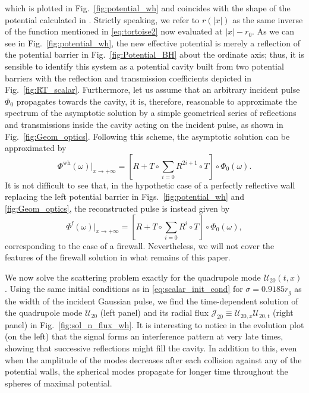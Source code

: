 \documentclass[article,aps,nofootinbib,twocolumn,superscriptaddress]{revtex4-1}
\begin{document}
which is plotted in Fig.~\ref{fig:potential_wh} and coincides with the shape of the potential calculated in \citep{Cardoso:2016oxy}. Strictly speaking, we refer to $r\left(|x|\right)$ as the same inverse of the function mentioned in \eqref{eq:tortoise2} now evaluated at $|x|-r_0$. As we can see in Fig.~\ref{fig:potential_wh}, the new effective potential is merely a reflection of the potential barrier in Fig.~\ref{fig:Potential_BH} about the ordinate axis; thus, it is sensible to identify this system as a potential cavity built from two potential barriers with the reflection and transmission coefficients depicted in Fig.~\ref{fig:RT_scalar}. Furthermore, let us assume that an arbitrary incident pulse $\Phi_0$ propagates towards the cavity, it is, therefore, reasonable to approximate the spectrum of the asymptotic solution by a simple geometrical series of reflections and transmissions inside the cavity acting on the incident pulse, as shown in Fig.~\ref{fig:Geom_optics}. Following this scheme, the asymptotic solution can be approximated by
\begin{equation}
\Phi^{\mathrm{wh}}(\omega)|_{x\rightarrow+\infty}=\left[R+T\circ\sum_{i=0}R^{2i+1}\circ T\right]\circ\Phi_0(\omega).
\label{eq:reconst}
\end{equation}
It is not difficult to see that, in the hypothetic case of a perfectly reflective wall replacing the left potential barrier in Figs.~\ref{fig:potential_wh} and \ref{fig:Geom_optics}, the reconstructed pulse is instead given by 
\begin{equation}
\Phi^{\mathrm{f}}(\omega)|_{x\rightarrow+\infty}=\left[R+T\circ\sum_{i=0}R^i\circ T\right]\circ\Phi_0(\omega),
\label{eq:reconst_firewall}
\end{equation}
corresponding to the case of a firewall. Nevertheless, we will not cover the features of the firewall solution in what remains of this paper. 

We now solve the scattering problem exactly for the quadrupole mode $\mathcal{U}_{20}(t,x)$. Using the same initial conditions as in \eqref{eq:scalar_init_cond} for $\sigma=0.9185r_g$ as the width of the incident Gaussian pulse, we find the time-dependent solution of the quadrupole mode $\mathcal{U}_{20}$ (left panel) and its radial flux $\mathcal{J}_{20}\equiv \mathcal{U}_{20,x} \mathcal{U}_{20,t}$ (right panel) in Fig.~\ref{fig:sol_n_flux_wh}. It is interesting to notice in the evolution plot (on the left) that the signal forms an interference pattern at very late times, showing that successive reflections might fill the cavity. In addition to this, even when the amplitude of the modes decreases after each collision against any of the potential walls, the spherical modes propagate for longer time throughout the spheres of maximal potential. 
\end{document}
